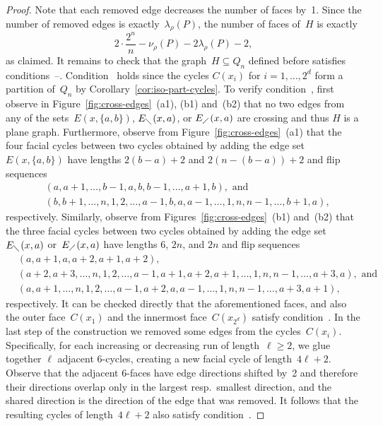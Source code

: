 \documentclass[11pt]{article}
\newcommand*\circled[1]{\tikz[baseline=(char.base)]{
            \node[shape=circle,draw,inner sep=1pt] (char) {#1};}}
\newcommand{\seq}{\subseteq}
\begin{document}
\begin{proof}
%
Note that each removed edge decreases the number of faces by~1.
Since the number of removed edges is exactly~$\lambda_\rho(P)$, the number of faces of~$H$ is exactly
\[ 2\cdot\frac{2^n}{n}-\nu_\rho(P)-2\lambda_\rho(P)-2, \]
as claimed.
%
It remains to check that the graph~$H\seq Q_n$ defined before satisfies conditions~\circled{1}--\circled{3}.
%
Condition~\circled{1} holds since the cycles $C(x_i)$ for $i=1,\dots,2^d$ form a partition of~$Q_n$ by Corollary~\ref{cor:iso-part-cycles}.
%
To verify condition~\circled{2}, first observe in Figure~\ref{fig:cross-edges}~(a1), (b1) and~(b2) that no two edges from any of the sets~$E(x,\{a,b\})$, $E_{\diagdown}(x,a)$, or $E_{\diagup}(x,a)$ are crossing and thus $H$ is a plane graph.
Furthermore, observe from Figure~\ref{fig:cross-edges}~(a1) that the four facial cycles between two cycles obtained by adding the edge set~$E(x,\{a,b\})$ have lengths $2(b-a)+2$ and $2(n-(b-a))+2$ and flip sequences
\begin{align*}
   & (a,a+1,\ldots,b-1,a,b,b-1,\dots,a+1,b), \text{ and} \\
   & (b,b+1,\ldots,n,1,2,\dots,a-1,b,a,a-1,\ldots,1,n,n-1,\dots,b+1,a),
\end{align*}
respectively.
Similarly, observe from Figures~\ref{fig:cross-edges}~(b1) and~(b2) that the three facial cycles between two cycles obtained by adding the edge set~$E_{\diagdown}(x,a)$ or~$E_{\diagup}(x,a)$ have lengths 6, $2n$, and $2n$ and flip sequences
\begin{align*}
   & (a,a+1,a,a+2,a+1,a+2), \\
   & (a+2,a+3,\ldots,n,1,2,\ldots,a-1,a+1,a+2,a+1,\dots,1,n,n-1,\ldots,a+3,a), \text{ and} \\
   & (a,a+1,\ldots,n,1,2,\ldots,a-1,a+2,a,a-1,\ldots,1,n,n-1,\dots,a+3,a+1),
\end{align*}
respectively.
It can be checked directly that the aforementioned faces, and also the outer face~$C(x_1)$ and the innermost face~$C(x_{2^d})$ satisfy condition~\circled{2}.
%
In the last step of the construction we removed some edges from the cycles~$C(x_i)$.
Specifically, for each increasing or decreasing run of length~$\ell\geq 2$, we glue together $\ell$ adjacent 6-cycles, creating a new facial cycle of length~$4\ell+2$.
Observe that the adjacent 6-faces have edge directions shifted by~2 and therefore their directions overlap only in the largest resp.\ smallest direction, and the shared direction is the direction of the edge that was removed.
It follows that the resulting cycles of length~$4\ell+2$ also satisfy condition~\circled{2}.

\end{proof}
\end{document}
